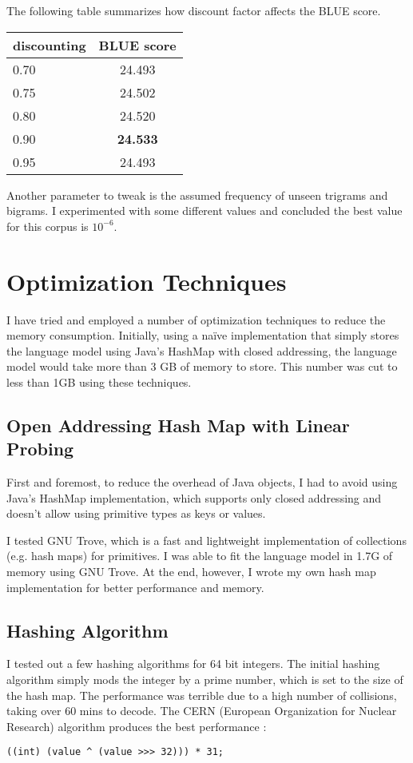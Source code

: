 \documentclass[12pt]{article}   %
\begin{document}
The following table summarizes how discount factor affects the BLUE score.

\begin{tabular}{ | l | c | }
	\hline
	discounting & BLUE score \\
	\hline
	0.70 & 24.493 \\
	0.75 & 24.502 \\
	0.80 & 24.520 \\
	0.90 & \textbf{24.533} \\
	0.95 & 24.493 \\
	\hline
\end{tabular}

Another parameter to tweak is the assumed frequency of unseen trigrams and bigrams. I experimented with some different values and concluded the best value for this corpus is $10^{-6}$.


\section{Optimization Techniques}
I have tried and employed a number of optimization techniques to reduce the memory consumption. Initially, using a naïve implementation that simply stores the language model using Java’s HashMap with closed addressing, the language model would take more than 3 GB of memory to store. This number was cut to less than 1GB using these techniques.

\subsection{Open Addressing Hash Map with Linear Probing}
First and foremost, to reduce the overhead of Java objects, I had to avoid using Java's HashMap implementation, which supports only closed addressing and doesn't allow using primitive types as keys or values.

I tested GNU Trove, which is a fast and lightweight implementation of collections (e.g. hash maps) for primitives. I was able to fit the language model in 1.7G of memory using GNU Trove. At the end, however, I wrote my own hash map implementation for better performance and memory.


\subsection{Hashing Algorithm}
I tested out a few hashing algorithms for 64 bit integers. The initial hashing algorithm simply mods the integer by a prime number, which is set to the size of the hash map. The performance was terrible due to a high number of collisions, taking over 60 mins to decode. The CERN (European Organization for Nuclear Research) algorithm produces the best performance :
\begin{verbatim}
((int) (value ^ (value >>> 32))) * 31;
\end{verbatim}
\end{document}
